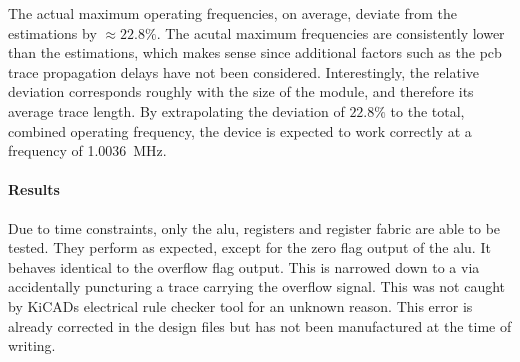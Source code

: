 The actual maximum operating frequencies, on average, deviate from the estimations by $\approx 22.8\%$. The acutal maximum frequencies are consistently lower than the estimations, which makes sense since additional factors such as the \ac{pcb} trace propagation delays have not been considered. Interestingly, the relative deviation corresponds roughly with the size of the module, and therefore its average trace length. By extrapolating the deviation of $22.8\%$ to the total, combined operating frequency, the device is expected to work correctly at a frequency of \SI{1.0036}{\mega\hertz}.

\paragraph*{Results}

Due to time constraints, only the \ac{alu}, registers and register fabric are able to be tested. They perform as expected, except for the zero flag output of the \ac{alu}. It behaves identical to the overflow flag output. This is narrowed down to a via accidentally puncturing a trace carrying the overflow signal. This was not caught by KiCADs electrical rule checker tool for an unknown reason. This error is already corrected in the design files but has not been manufactured at the time of writing.
